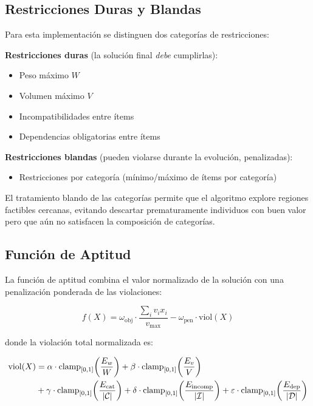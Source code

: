 \subsection{Restricciones Duras y Blandas}

Para esta implementación se distinguen dos categorías de restricciones:

\textbf{Restricciones duras} (la solución final \emph{debe} cumplirlas):
\begin{itemize}
  \item Peso máximo $W$
  \item Volumen máximo $V$
  \item Incompatibilidades entre ítems
  \item Dependencias obligatorias entre ítems
\end{itemize}

\textbf{Restricciones blandas} (pueden violarse durante la evolución, penalizadas):
\begin{itemize}
  \item Restricciones por categoría (mínimo/máximo de ítems por categoría)
\end{itemize}

El tratamiento blando de las categorías permite que el algoritmo explore regiones
factibles cercanas, evitando descartar prematuramente individuos con buen valor pero
que aún no satisfacen la composición de categorías.

\subsection{Función de Aptitud}

La función de aptitud combina el valor normalizado de la solución con una penalización
ponderada de las violaciones:

\begin{equation}
  f(X) = \omega_{\text{obj}} \cdot \frac{\sum_i v_i x_i}{v_{\max}}
         - \omega_{\text{pen}} \cdot \text{viol}(X)
  \label{eq:fitness}
\end{equation}

donde la violación total normalizada es:

\begin{align}
  \text{viol}(X) &=
    \alpha \cdot \text{clamp}_{[0,1]}\!\left(\frac{E_w}{W}\right)
  + \beta  \cdot \text{clamp}_{[0,1]}\!\left(\frac{E_v}{V}\right) \notag\\
  &+ \gamma \cdot \text{clamp}_{[0,1]}\!\left(\frac{E_{\text{cat}}}{|\mathcal{C}|}\right)
  + \delta \cdot \text{clamp}_{[0,1]}\!\left(\frac{E_{\text{incomp}}}{|\mathcal{I}|}\right)
  + \varepsilon \cdot \text{clamp}_{[0,1]}\!\left(\frac{E_{\text{dep}}}{|\mathcal{D}|}\right)
  \label{eq:viol}
\end{align}

